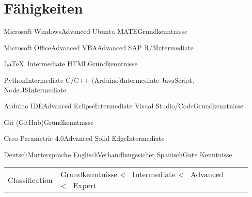 
\section*{Fähigkeiten}
\medskip





	{Microsoft Windows}{Advanced}
	{Ubuntu MATE}{Grundkenntnisse}
	{}{}
	{}{}



%
	{Microsoft Office}{Advanced}
	{VBA}{Advanced}
	{SAP R/3}{Intermediate}
	{}{}
	

%
	{\LaTeX\ }{Intermediate}
	{HTML}{Grundkenntnisse}
	{}{}
	{}{}
	

%
	{Python}{Intermediate}	
	{C/C++ (Arduino)}{Intermediate}
	{JavaScript, Node.JS}{Intermediate}
	{}{}



	{Arduino IDE}{Advanced}	
	{Eclipse}{Intermediate}
	{Visual Studio/Code}{Grundkenntnisse}
	{}{}


	{Git (GitHub)}{Grundkenntnisse}
	{}{}
	{}{}
	{}{}
	
	
	{Creo Parametric 4.0}{Advanced}
	{Solid Edge}{Intermediate}
	{}{}
	{}{}


	{Deutsch}{Muttersprache}
	{Englisch}{Verhandlungssicher}
	{Spanisch}{Gute Kenntnisse}
	{}{}
	
	
	

\noindent
\begin{tabular*}{\textwidth}{@{}R{6cm}|lll}
	\noindent
	{\small Classification}	&	{\small Grundkenntnisse \textless~ Intermediate \textless~ Advanced \textless~ Expert}
\end{tabular*}

